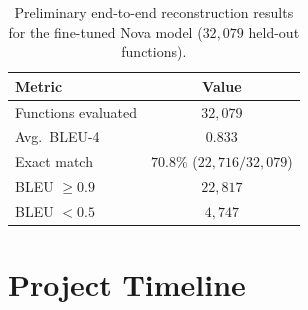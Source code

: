 \documentclass{stylefiles/capstone}
\begin{document}
\begin{table}[t]
\centering
\caption{Preliminary end-to-end reconstruction results for the fine-tuned Nova
model ($32{,}079$ held-out functions).}
\label{tab:nova}
\small
\begin{tabular}{l c}
\toprule
Metric & Value \\
\midrule
Functions evaluated         & $32{,}079$ \\
Avg.\ BLEU-4                 & $0.833$ \\
Exact match                  & $70.8\%$ \;($22{,}716/32{,}079$) \\
BLEU $\geq 0.9$              & $22{,}817$ \\
BLEU $< 0.5$                 & $4{,}747$ \\
\bottomrule
\end{tabular}
\end{table}

\section{Project Timeline}
\end{document}
